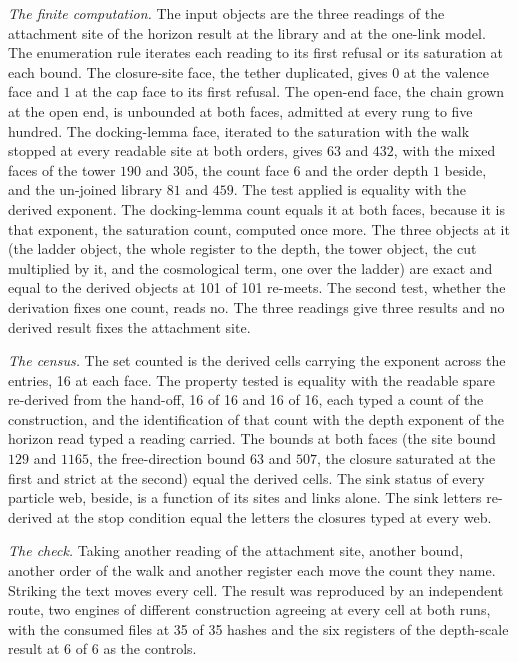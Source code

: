 \begin{chproof}
\textit{The finite computation.} The input objects are the three readings of the attachment site of the horizon result at the library and at the one-link model. The enumeration rule iterates each reading to its first refusal or its saturation at each bound. The closure-site face, the tether duplicated, gives $0$ at the valence face and $1$ at the cap face to its first refusal. The open-end face, the chain grown at the open end, is unbounded at both faces, admitted at every rung to five hundred. The docking-lemma face, iterated to the saturation with the walk stopped at every readable site at both orders, gives $63$ and $432$, with the mixed faces of the tower $190$ and $305$, the count face $6$ and the order depth $1$ beside, and the un-joined library $81$ and $459$. The test applied is equality with the derived exponent. The docking-lemma count equals it at both faces, because it is that exponent, the saturation count, computed once more. The three objects at it (the ladder object, the whole register to the depth, the tower object, the cut multiplied by it, and the cosmological term, one over the ladder) are exact and equal to the derived objects at 101 of 101 re-meets. The second test, whether the derivation fixes one count, reads no. The three readings give three results and no derived result fixes the attachment site.

\textit{The census.} The set counted is the derived cells carrying the exponent across the entries, 16 at each face. The property tested is equality with the readable spare re-derived from the hand-off, 16 of 16 and 16 of 16, each typed a count of the construction, and the identification of that count with the depth exponent of the horizon read typed a reading carried. The bounds at both faces (the site bound $129$ and $1165$, the free-direction bound $63$ and $507$, the closure saturated at the first and strict at the second) equal the derived cells. The sink status of every particle web, beside, is a function of its sites and links alone. The sink letters re-derived at the stop condition equal the letters the closures typed at every web.

\textit{The check.} Taking another reading of the attachment site, another bound, another order of the walk and another register each move the count they name. Striking the text moves every cell. The result was reproduced by an independent route, two engines of different construction agreeing at every cell at both runs, with the consumed files at 35 of 35 hashes and the six registers of the depth-scale result at 6 of 6 as the controls.
\end{chproof}
